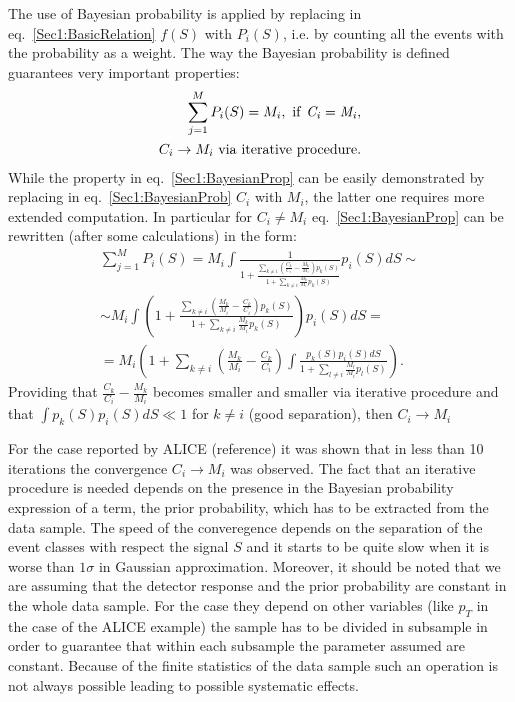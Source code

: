 The use of Bayesian probability is applied by replacing in eq.~\ref{Sec1:BasicRelation} $f(S)$ with $P_{i}(S)$, i.e. by counting all the events with the probability as a weight. The way the Bayesian probability is defined guarantees very important properties:
\begin{eqnarray}
\label{Sec1:BayesianProp}
\sum\limits_{j=1}^{M}P_{i}(S) = M_{i},{\rm\ if\ {\it C_{i} = M_{i}}}, \\
\label{Sec1:BayesianProp2}
C_{i} \rightarrow M_{i} {\rm\ via\ iterative\ procedure}.
\end{eqnarray}
While the property in eq.~\ref{Sec1:BayesianProp} can be easily demonstrated by replacing in eq.~\ref{Sec1:BayesianProb}  $C_{i}$ with $M_{i}$, the latter one requires more extended computation.
In particular for $C_{i} \neq M_{i}$ eq.~\ref{Sec1:BayesianProp} can be rewritten (after some calculations) in the form:
\begin{eqnarray}
\label{Sec1:BayesFullCalc}
\sum\limits_{j=1}^{M}P_{i}(S) = M_{i} \int \frac{1}{1+\frac{\sum\limits_{k \neq i} \left( \frac{C_k}{C_i} - \frac{M_k}{M_i} \right) p_{k}(S)}{1 + \sum\limits_{k \neq i} \frac{M_k}{M_i} p_k(S)}} p_{i}(S)dS \sim \\
\sim M_{i} \int  \left( 1+\frac{\sum\limits_{k \neq i} \left( \frac{M_k}{M_i} - \frac{C_k}{C_i} \right) p_{k}(S)}{1 + \sum\limits_{k \neq i} \frac{M_k}{M_i} p_k(S)} \right) p_{i}(S)dS = \\
= M_{i}  \left( 1 + \sum\limits_{k \neq i}  \left( \frac{M_k}{M_i} - \frac{C_k}{C_i} \right) \int  \frac{p_{k}(S)p_{i}(S)dS}{1+\sum\limits_{l \neq i} \frac{M_l}{M_i} p_l(S)} \right).
\end{eqnarray}
Providing that $\frac{C_k}{C_i} - \frac{M_k}{M_i}$ becomes smaller and smaller via iterative procedure and that $\int p_{k}(S)p_{i}(S)dS \ll 1$ for $k \neq i$ (good separation), then $C_i \rightarrow M_i$

For the case reported by ALICE (reference) it was shown that in less than 10 iterations the convergence $C_{i} \rightarrow M_{i}$ was observed.
The fact that an iterative procedure is needed depends on the presence in the Bayesian probability expression of a term, the prior probability, which has to be extracted from the data sample. The speed of the converegence depends on the separation of the event classes with respect the signal $S$ and it starts to be quite slow when it is worse than $1\sigma$ in Gaussian approximation.
Moreover, it should be noted that we are assuming that the detector response and the prior probability are constant in the whole data sample.
For the case they depend on other variables (like $p_{T}$ in the case of the ALICE example) the sample has to be divided in subsample in order to guarantee that within each subsample the parameter assumed are constant. Because of the finite statistics of the data sample such an operation is not always possible leading to possible systematic effects.

